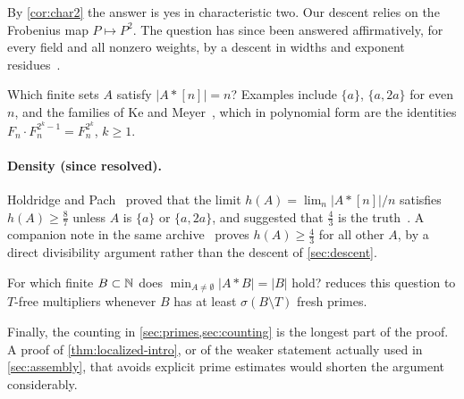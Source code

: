 By \cref{cor:char2} the answer is yes in characteristic two. Our descent relies on the Frobenius map $P\mapsto P^2$. The question has since been answered affirmatively, for every field and all nonzero weights, by a descent in widths and exponent residues~\cite{Weighted}.

\begin{question}[Equality]
Which finite sets $A$ satisfy $|A*[n]|=n$? Examples include $\{a\}$, $\{a,2a\}$ for even $n$, and the families of Ke and Meyer~\cite{KM}, which in polynomial form are the identities $F_n\cdot F_n^{2^k-1}=F_n^{2^k}$, $k\ge1$.
\end{question}

\paragraph{Density (since resolved).}
Holdridge and Pach~\cite[Theorem~1.8]{HP} proved that the limit $h(A)=\lim_n|A*[n]|/n$ satisfies $h(A)\ge\frac87$ unless $A$ is $\{a\}$ or $\{a,2a\}$, and suggested that $\frac43$ is the truth~\cite[Remark~1.9]{HP}. A companion note in the same archive~\cite{Weighted} proves $h(A)\ge\frac43$ for all other $A$, by a direct divisibility argument rather than the descent of \cref{sec:descent}.

\begin{question}
For which finite $B\subset\mathbb{N}$ does $\min_{A\ne\emptyset}|A*B|=|B|$ hold?  reduces this question to $T$-free multipliers whenever $B$ has at least $\sigma(B\setminus T)$ fresh primes.
\end{question}

Finally, the counting in \cref{sec:primes,sec:counting} is the longest part of the proof. A proof of \cref{thm:localized-intro}, or of the weaker statement actually used in \cref{sec:assembly}, that avoids explicit prime estimates would shorten the argument considerably.
